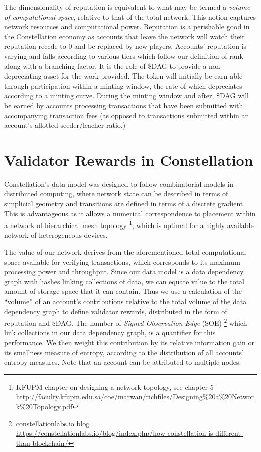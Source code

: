 \documentclass{article}
\begin{document}
The dimensionality of reputation is equivalent to what may be termed a {\emph{volume of computational space}}, relative to that of the total network. This notion captures network resources and computational power. Reputation is a perishable good in the Constellation economy as accounts that leave the network will watch their reputation recede to $0$ and be replaced by new players. Accounts' reputation is varying and falls according to various tiers which follow our definition of rank along with a branching factor. It is the role of \$DAG to provide a non-depreciating asset for the work provided. The token will initially be earn-able through participation within a minting window, the rate of which depreciates according to a minting curve. During the minting window and after, \$DAG will be earned by accounts processing transactions that have been submitted with accompanying transaction fees (as opposed to transactions submitted within an account's allotted seeder/leacher ratio.)

\section{Validator Rewards in Constellation}
Constellation's data model was designed to follow combinatorial models in distributed computing, where network state can be described in terms of simplicial geometry and transitions are defined in terms of a discrete gradient. This is advantageous as it allows a numerical correspondence to placement within a network of hierarchical mesh topology
\footnote{KFUPM chapter on designing a network topology, see chapter 5\\ \url{http://faculty.kfupm.edu.sa/coe/marwan/richfiles/Designing\%20a\%20Network\%20Topology.pdf}}, 
which is optimal for a highly available network of heterogeneous devices.

The value of our network derives from the aforementioned total computational space available for verifying transactions, which corresponds to its maximum processing power and throughput. Since our data model is a data dependency graph with hashes linking collections of data, we can equate value to the total amount of storage space that it can contain. Thus we use a calculation of the ``volume'' of an account's contributions relative to the total volume of the data dependency graph to define validator rewards, distributed in the form of reputation and \$DAG. The number of {\emph{Signed Observation Edge}} (SOE)
\footnote{constellationlabs.io blog\\ \url{https://constellationlabs.io/blog/index.php/how-constellation-is-different-than-blockchain/}} 
which link collections in our data dependency graph, is a quantifier for this performance. We then weight this contribution by its relative information gain or its smallness measure of entropy, according to the distribution of all accounts' entropy measures. Note that an account can be attributed to multiple nodes.
\end{document}
